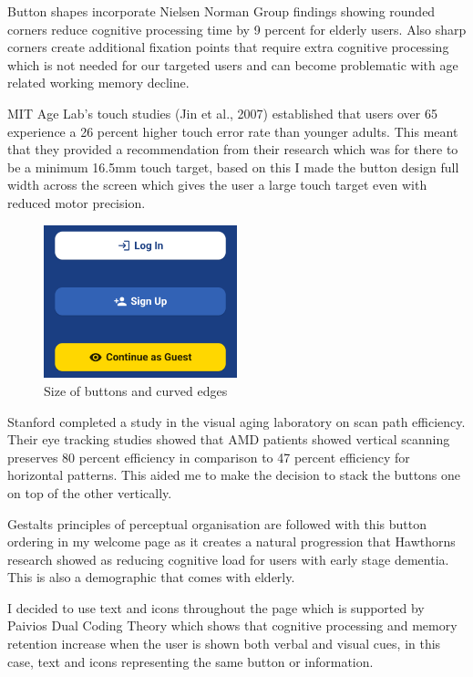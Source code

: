 \documentclass[]{project_final}
\begin{document}
Button shapes incorporate Nielsen Norman Group findings showing rounded corners reduce cognitive processing time by 9 percent for elderly users. Also sharp corners create additional fixation points that require extra cognitive processing which is not needed for our targeted users and can become problematic with age related working memory decline.

MIT Age Lab's touch studies (Jin et al., 2007) established that users over 65 experience a 26 percent higher touch error rate than younger adults. This meant that they provided a recommendation from their research which was for there to be a minimum 16.5mm touch target, based on this I made the button design full width across the screen which gives the user a large touch target even with reduced motor precision.

\begin{figure}[ht!]
  \centering
  \includegraphics[width=0.5\textwidth]{m1.png}
  \caption{Size of buttons and curved edges}
  \label{fig:1}
\end{figure}


Stanford completed a study in the visual aging laboratory on scan path efficiency. Their eye tracking studies showed that AMD patients showed vertical scanning preserves 80 percent efficiency in comparison to 47 percent efficiency for horizontal patterns. This aided me to make the decision to stack the buttons one on top of the other vertically.

Gestalts principles of perceptual organisation  are followed with this button ordering in my welcome page as it creates a natural progression that Hawthorns research showed as reducing cognitive load for users with early stage dementia. This is also a demographic that comes with elderly.


I decided to use text and icons throughout the page which is supported by Paivios Dual Coding Theory which shows that cognitive processing and memory retention increase when the user is shown both verbal and visual cues, in this case, text and icons representing the same button or information.
\end{document}
